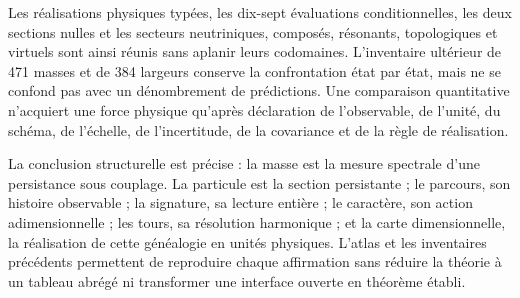 Les réalisations physiques typées, les dix-sept évaluations conditionnelles, les
deux sections nulles et les secteurs neutriniques, composés, résonants,
topologiques et virtuels sont ainsi réunis sans aplanir leurs codomaines.
L'inventaire ultérieur de 471 masses et de 384 largeurs conserve la confrontation
état par état, mais ne se confond pas avec un dénombrement de prédictions. Une
comparaison quantitative n'acquiert une force physique qu'après déclaration de
l'observable, de l'unité, du schéma, de l'échelle, de l'incertitude, de la covariance et de la règle de
réalisation.

La conclusion structurelle est précise : la masse est la mesure spectrale d'une
persistance sous couplage. La particule est la section persistante ; le parcours,
son histoire observable ; la signature, sa lecture entière ; le caractère, son action
adimensionnelle ; les tours, sa résolution harmonique ; et la carte dimensionnelle, la
réalisation de cette généalogie en unités physiques. L'atlas et les inventaires
précédents permettent de reproduire chaque affirmation sans réduire la théorie à un
tableau abrégé ni transformer une interface ouverte en théorème établi.
